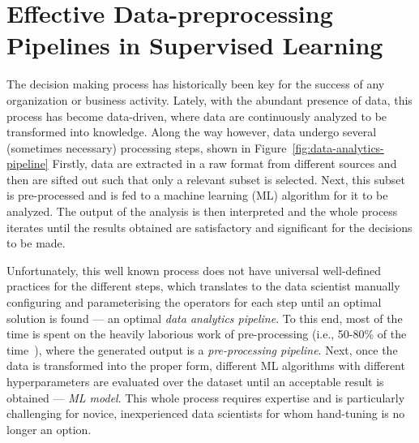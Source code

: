 
\chapter{Effective Data-preprocessing Pipelines in Supervised Learning}
\label{data-centric-chap:supervised}

The decision making process has historically been key for the success of any organization or business activity.
Lately, with the abundant presence of data, this process has become data-driven,
where data are continuously analyzed to be transformed into knowledge.
Along the way however, data undergo several (sometimes necessary) processing steps, shown in Figure~\ref{fig:data-analytics-pipeline}
Firstly, data are extracted in a raw format from different sources and then are sifted out such that only a relevant subset is selected.
Next, this subset is pre-processed and is fed to a machine learning (ML) algorithm for it to be analyzed.
The output of the analysis is then interpreted and the whole process iterates until the results obtained are satisfactory and significant for the decisions to be made.

Unfortunately, this well known process does not have universal well-defined practices for the different steps, which translates to the data scientist manually configuring and parameterising the operators for each step until an optimal solution is found --- an optimal \textit{data analytics pipeline}. To this end, most of the time is spent on the heavily laborious work of pre-processing (i.e., 50-80\% of the time~\cite{Munson09Pre}), where the generated output is a \textit{pre-processing pipeline}. Next, once the data is transformed into the proper form, different ML algorithms with different hyperparameters are evaluated over the dataset until an acceptable result is obtained --- \textit{ML model}. This whole process requires expertise and is particularly challenging for novice, inexperienced data scientists for whom hand-tuning is no longer an option.

